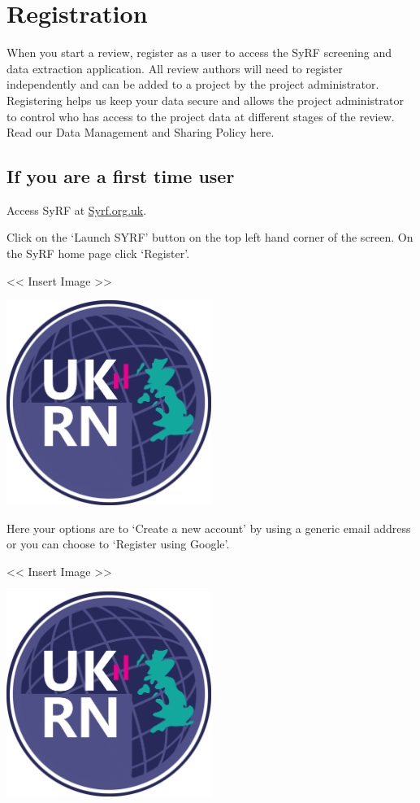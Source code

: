 \documentclass[
]{book}
\begin{document}
\hypertarget{registration}{%
\chapter{Registration}\label{registration}}

When you start a review, register as a user to access the SyRF screening and data extraction application. All review authors will need to register independently and can be added to a project by the project administrator. Registering helps us keep your data secure and allows the project administrator to control who has access to the project data at different stages of the review. Read our Data Management and Sharing Policy here.

\hypertarget{if-you-are-a-first-time-user}{%
\section{If you are a first time user}\label{if-you-are-a-first-time-user}}

Access SyRF at \href{http://syrf.org.uk}{Syrf.org.uk}.

Click on the `Launch SYRF' button on the top left hand corner of the screen.
On the SyRF home page click `Register'.

\textless{}\textless{} Insert Image \textgreater{}\textgreater{}

\includegraphics[width=0.5\textwidth,height=0.5\textheight]{figs/evidence-triangle.png}

Here your options are to `Create a new account' by using a generic email address or you can choose to `Register using Google'.

\textless{}\textless{} Insert Image \textgreater{}\textgreater{}

\includegraphics[width=0.5\textwidth,height=0.5\textheight]{figs/evidence-triangle.png}
\end{document}

